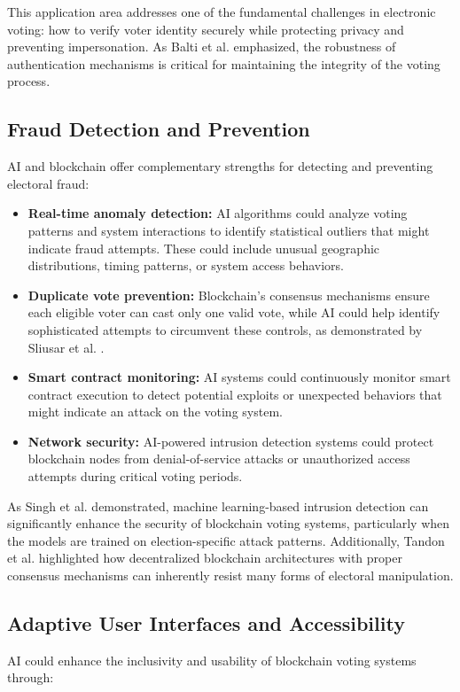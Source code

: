 \documentclass[conference]{IEEEtran}
\begin{document}
This application area addresses one of the fundamental challenges in electronic voting: how to verify voter identity securely while protecting privacy and preventing impersonation. As Balti et al. \cite{b2} emphasized, the robustness of authentication mechanisms is critical for maintaining the integrity of the voting process.

\subsection{Fraud Detection and Prevention}
AI and blockchain offer complementary strengths for detecting and preventing electoral fraud:

\begin{itemize}
    \item \textbf{Real-time anomaly detection:} AI algorithms could analyze voting patterns and system interactions to identify statistical outliers that might indicate fraud attempts. These could include unusual geographic distributions, timing patterns, or system access behaviors.
    
    \item \textbf{Duplicate vote prevention:} Blockchain's consensus mechanisms ensure each eligible voter can cast only one valid vote, while AI could help identify sophisticated attempts to circumvent these controls, as demonstrated by Sliusar et al. \cite{b4}.
    
    \item \textbf{Smart contract monitoring:} AI systems could continuously monitor smart contract execution to detect potential exploits or unexpected behaviors that might indicate an attack on the voting system.
    
    \item \textbf{Network security:} AI-powered intrusion detection systems could protect blockchain nodes from denial-of-service attacks or unauthorized access attempts during critical voting periods.
\end{itemize}

As Singh et al. \cite{b5} demonstrated, machine learning-based intrusion detection can significantly enhance the security of blockchain voting systems, particularly when the models are trained on election-specific attack patterns. Additionally, Tandon et al. \cite{b3} highlighted how decentralized blockchain architectures with proper consensus mechanisms can inherently resist many forms of electoral manipulation.

\subsection{Adaptive User Interfaces and Accessibility}
AI could enhance the inclusivity and usability of blockchain voting systems through:
\end{document}
